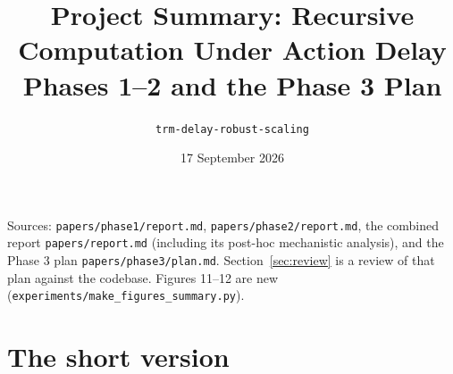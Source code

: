 \documentclass[11pt]{article}
\title{Project Summary: Recursive Computation Under Action Delay\\[2pt]
\large Phases 1--2 and the Phase 3 Plan}
\author{\texttt{trm-delay-robust-scaling}}
\date{17 September 2026}
\begin{document}
\maketitle

\noindent\small Sources: \texttt{papers/phase1/report.md}, \texttt{papers/phase2/report.md}, the combined report \texttt{papers/report.md} (including its post-hoc mechanistic analysis), and the Phase 3 plan \texttt{papers/phase3/plan.md}. Section~\ref{sec:review} is a review of that plan against the codebase. Figures 11--12 are new (\texttt{experiments/make\_figures\_summary.py}).\normalsize

\section*{The short version}
\end{document}

